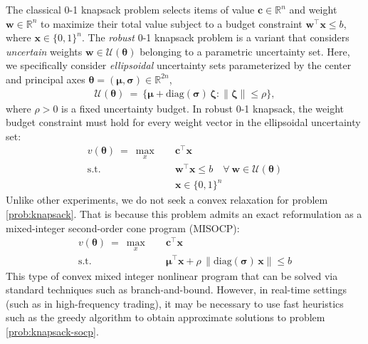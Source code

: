 \documentclass[10pt]{article} %
\theoremstyle{plain}
\theoremstyle{definition}
\theoremstyle{remark}
\begin{document}
The classical 0-1 knapsack problem selects items of value $\mathbf{c} \in \mathbb{R}^n$ and weight $\mathbf{w} \in \mathbb{R}^n$ to maximize their total value subject to a budget constraint $\mathbf{w}^\top \mathbf{x} \leq b$, where $\mathbf{x} \in \{0, 1\}^n$.
The \textit{robust} 0-1 knapsack problem is a variant that considers \textit{uncertain} weights $\mathbf{w} \in \mathcal{U}(\bm{\theta})$ belonging to a parametric uncertainty set.
Here, we specifically consider \textit{ellipsoidal} uncertainty sets parameterized by the center and principal axes $\bm{\theta} = (\bm{\mu}, \bm{\sigma}) \in \mathbb{R}^{2n}$,
\begin{align*}
    \mathcal{U}(\bm{\theta}) ~=~ \{ \bm{\mu} + \mathrm{diag}(\bm{\sigma}) \, \bm{\zeta} : \| \bm{\zeta} \| \leq \rho \},
\end{align*}
where $\rho > 0$ is a fixed uncertainty budget. In robust 0-1 knapsack, the weight budget constraint must hold for every weight vector in the ellipsoidal uncertainty set:
\begin{equation}
\begin{aligned}
    v(\bm{\theta}) ~=~ \max_{x} \quad & \mathbf{c}^\top \mathbf{x} \\
    \text{s.t.} \quad & \mathbf{w}^\top \mathbf{x} \leq b \quad \forall ~ \mathbf{w} \in \mathcal{U}(\bm{\theta}) \\
    & \mathbf{x} \in \{0, 1\}^n
\end{aligned}
\label{prob:knapsack}
\end{equation}
Unlike other experiments, we do not seek a convex relaxation for problem \cref{prob:knapsack}{}{}. That is because this problem admits an exact reformulation as a mixed-integer second-order cone program (MISOCP):
\begin{equation}
\begin{aligned}
    v(\bm{\theta}) ~=~ \max_{x} \quad & \mathbf{c}^\top \mathbf{x} \\
    \text{s.t.} \quad & \bm{\mu}^\top \mathbf{x} + \rho\,\|\mathrm{diag}(\bm{\sigma})\,\mathbf{x}\| \leq b
\end{aligned}
\label{prob:knapsack-socp}
\end{equation}
This type of convex mixed integer nonlinear program that can be solved via standard techniques such as branch-and-bound. However, in real-time settings (such as in high-frequency trading), it may be necessary to use fast heuristics such as the greedy algorithm to obtain approximate solutions to problem \cref{prob:knapsack-socp}{}{}.
\end{document}

